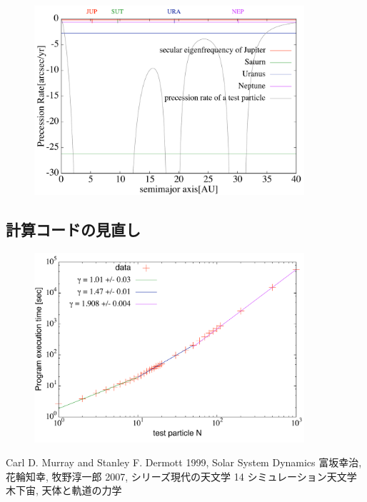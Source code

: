 \documentclass[11pt,a4paper,oneside,onecolumn]{jarticle}
\begin{document}
\begin{figure}[H]
\centering
\includegraphics[width=10cm]{./image/PrecessionRate_B.pdf}
\caption{\label{}}
\end{figure}




\subsection{計算コードの見直し}
\begin{figure}[H]
\centering
\includegraphics[width=10cm]{./image/Nbody_test.pdf}
\caption{\label{}}
\end{figure}

\begin{thebibliography}{9}
   Carl D. Murray and Stanley F. Dermott 1999, Solar System Dynamics
   富坂幸治, 花輪知幸, 牧野淳一郎 2007, シリーズ現代の天文学 14 シミュレーション天文学
   木下宙, 天体と軌道の力学
\end{thebibliography}
\end{document}
